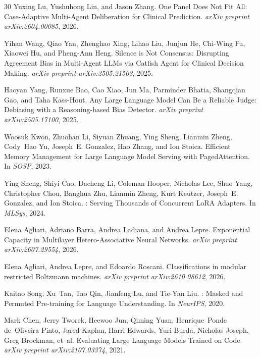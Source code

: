 \documentclass[11pt,a4paper]{article}
\begin{document}
\begin{thebibliography}{30}
Yuxing Lu, Yushuhong Lin, and Jason Zhang.
\newblock One Panel Does Not Fit All: Case-Adaptive Multi-Agent Deliberation for Clinical Prediction.
\newblock \emph{arXiv preprint arXiv:2604.00085}, 2026.

Yihan Wang, Qiao Yan, Zhenghao Xing, Lihao Liu, Junjun He, Chi-Wing Fu, Xiaowei Hu, and Pheng-Ann Heng.
\newblock Silence is Not Consensus: Disrupting Agreement Bias in Multi-Agent {LLMs} via Catfish Agent for Clinical Decision Making.
\newblock \emph{arXiv preprint arXiv:2505.21503}, 2025.

Haoyan Yang, Runxue Bao, Cao Xiao, Jun Ma, Parminder Bhatia, Shangqian Gao, and Taha Kass-Hout.
\newblock Any Large Language Model Can Be a Reliable Judge: Debiasing with a Reasoning-based Bias Detector.
\newblock \emph{arXiv preprint arXiv:2505.17100}, 2025.

Woosuk Kwon, Zhuohan Li, Siyuan Zhuang, Ying Sheng, Lianmin Zheng, Cody~Hao Yu, Joseph~E. Gonzalez, Hao Zhang, and Ion Stoica.
\newblock Efficient Memory Management for Large Language Model Serving with {PagedAttention}.
\newblock In \emph{SOSP}, 2023.

Ying Sheng, Shiyi Cao, Dacheng Li, Coleman Hooper, Nicholas Lee, Shuo Yang, Christopher Chou, Banghua Zhu, Lianmin Zheng, Kurt Keutzer, Joseph~E. Gonzalez, and Ion Stoica.
: Serving Thousands of Concurrent {LoRA} Adapters.
\newblock In \emph{MLSys}, 2024.

Elena Agliari, Adriano Barra, Andrea Ladiana, and Andrea Lepre.
\newblock Exponential Capacity in Multilayer Hetero-Associative Neural Networks.
\newblock \emph{arXiv preprint arXiv:2607.29554}, 2026.

Elena Agliari, Andrea Lepre, and Edoardo Roscani.
\newblock Classifications in modular restricted {Boltzmann} machines.
\newblock \emph{arXiv preprint arXiv:2610.08612}, 2026.

Kaitao Song, Xu~Tan, Tao Qin, Jianfeng Lu, and Tie-Yan Liu.
: Masked and Permuted Pre-training for Language Understanding.
\newblock In \emph{NeurIPS}, 2020.

Mark Chen, Jerry Tworek, Heewoo Jun, Qiming Yuan, Henrique~Ponde de~Oliveira Pinto, Jared Kaplan, Harri Edwards, Yuri Burda, Nicholas Joseph, Greg Brockman, et~al.
\newblock Evaluating Large Language Models Trained on Code.
\newblock \emph{arXiv preprint arXiv:2107.03374}, 2021.


\end{thebibliography}
\end{document}

